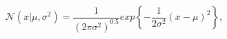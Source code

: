 \begin{equation}
\label{eq:gaussiandistribution}
\mathcal{N}(x | \mu, \sigma^2) = \frac{1}{(2 \pi \sigma^2)^{0.5}} exp \left\{
 - \frac{1}{2 \sigma^2} (x - \mu)^2	\right\} ,
\end{equation}
